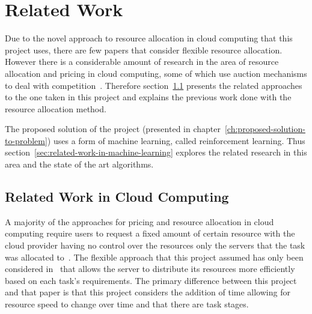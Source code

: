 \chapter{Related Work}\label{ch:background-literature}
Due to the novel approach to resource allocation in cloud computing that this project uses, there are few papers
that consider flexible resource allocation. However there is a considerable amount of research in the area of
resource allocation and pricing in cloud computing, some of which use auction mechanisms to deal with
competition~\citep{KUMAR2017234,Zhang2017,Du2019,Bi2019}. Therefore section~\ref{sec:related-work-in-cloud-computing}
presents the related approaches to the one taken in this project and explains the previous work done with the
resource allocation method.

The proposed solution of the project (presented in chapter~\ref{ch:proposed-solution-to-problem}) uses a form of
machine learning, called reinforcement learning. Thus section~\ref{sec:related-work-in-machine-learning}
explores the related research in this area and the state of the art algorithms.

\section{Related Work in Cloud Computing}\label{sec:related-work-in-cloud-computing} %
A majority of the approaches for pricing and resource allocation in cloud computing require users to request a
fixed amount of certain resource with the cloud provider having no control over the resources only the servers that the
task was allocated to~\citep{KUMAR2017234,Zhang2017,Du2019,Bi2019}. The flexible approach that this project
assumed has only been considered in~\cite{FlexibleResourceAllocation} that allows the server to distribute its resources
more efficiently based on each task's requirements. The primary difference between this project and that paper is that this
project considers the addition of time allowing for resource speed to change over time and that there are task stages.


